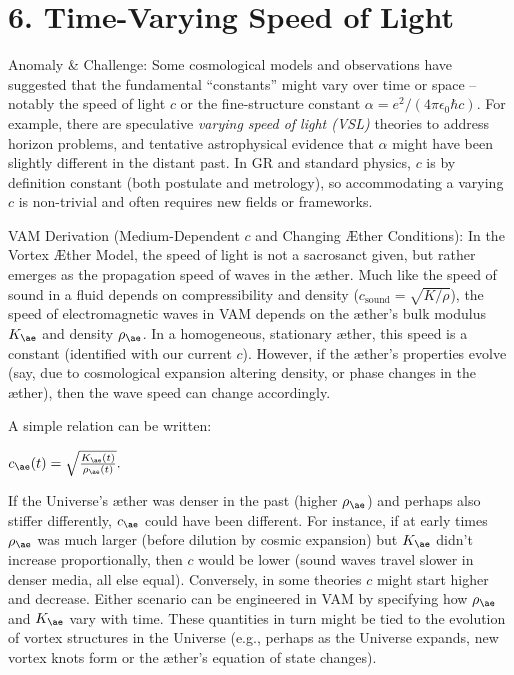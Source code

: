 \documentclass[a4paper, aps,preprint,superscriptaddress, 12pt]{revtex4}
\begin{document}
\section*{6. Time-Varying Speed of Light}

Anomaly \& Challenge: Some cosmological models and observations have suggested that the fundamental “constants” might vary over time or space – notably the speed of light $c$ or the fine-structure constant $\alpha = e^2/(4\pi\epsilon_0\hbar c)$. For example, there are speculative \textit{varying speed of light (VSL)} theories to address horizon problems, and tentative astrophysical evidence that $\alpha$ might have been slightly different in the distant past. In GR and standard physics, $c$ is by definition constant (both postulate and metrology), so accommodating a varying $c$ is non-trivial and often requires new fields or frameworks.


VAM Derivation (Medium-Dependent $c$ and Changing Æther Conditions): In the Vortex Æther Model, the speed of light is not a sacrosanct given, but rather emerges as the propagation speed of waves in the æther. Much like the speed of sound in a fluid depends on compressibility and density ($c_{\text{sound}} = \sqrt{K/\rho}$), the speed of electromagnetic waves in VAM depends on the æther’s bulk modulus $K_{\ae}$ and density $\rho_{\ae}$. In a homogeneous, stationary æther, this speed is a constant (identified with our current $c$). However, if the æther’s properties evolve (say, due to cosmological expansion altering density, or phase changes in the æther), then the wave speed can change accordingly.


A simple relation can be written:

$c_{\ae}(t) = \sqrt{\frac{K_{\ae}(t)}{\rho_{\ae}(t)}}.$

If the Universe’s æther was denser in the past (higher $\rho_{\ae}$) and perhaps also stiffer differently, $c_{\ae}$ could have been different. For instance, if at early times $\rho_{\ae}$ was much larger (before dilution by cosmic expansion) but $K_{\ae}$ didn’t increase proportionally, then $c$ would be lower (sound waves travel slower in denser media, all else equal). Conversely, in some theories $c$ might start higher and decrease. Either scenario can be engineered in VAM by specifying how $\rho_{\ae}$ and $K_{\ae}$ vary with time. These quantities in turn might be tied to the evolution of vortex structures in the Universe (e.g., perhaps as the Universe expands, new vortex knots form or the æther’s equation of state changes).
\end{document}
